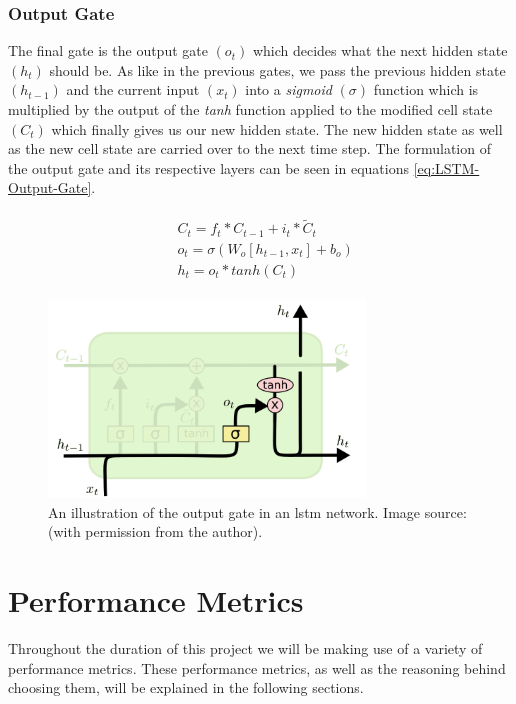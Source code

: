 \subsubsection{Output Gate}
\label{subsubsec:Background-Information:Long-Short-Term-Memory-Networks:Output-Gate}
The final gate is the output gate $(o_t)$ which decides what the next hidden state $(h_t)$ should be. As like in the previous gates, we pass the previous hidden state $(h_{t-1})$ and the current input $(x_t)$ into a \textit{sigmoid} $(\sigma)$ function which is multiplied by the output of the \textit{tanh} function applied to the modified cell state $(C_t)$ which finally gives us our new hidden state. The new hidden state as well as the new cell state are carried over to the next time step. The formulation of the output gate and its respective layers can be seen in equations \ref{eq:LSTM-Output-Gate}.

\begin{align}
    \begin{split}
        & C_t = f_t * C_{t-1} + i_t * \tilde{C}_t \\
        & o_t = \sigma (W_o \left[h_{t-1}, x_t \right] + b_o) \\
        & h_t = o_t * tanh(C_t)
    \end{split}
\label{eq:LSTM-Output-Gate}
\end{align}

\begin{figure}[H]
    \centering
    \includegraphics[width=0.75\textwidth]{Images/Chapter 3/LSTM/LSTM-Output-Gate-Illustration.png}
    \caption{An illustration of the output gate in an \gls{lstm} network. Image source: \cite{Colah}  (with permission from the author).}
    \label{fig:LSTM-Output-Gate-Illustration}
\end{figure}

\clearpage

\section{Performance Metrics}
\label{sec:Background-Information:Performance-Metrics}
Throughout the duration of this project we will be making use of a variety of performance metrics. These performance metrics, as well as the reasoning behind choosing them, will be explained in the following sections.

